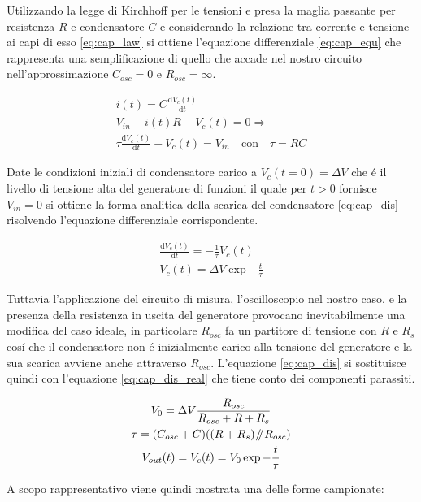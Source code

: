 \documentclass{article}
\newcommand{\de}{\mathrm{d}}
\newcommand{\pars}{\mathbin{\!/\mkern-5mu/\!}}
\begin{document}
Utilizzando la legge di Kirchhoff per le tensioni e presa la maglia passante per resistenza $R$ e condensatore $C$ e considerando la relazione tra corrente e tensione ai capi di esso \ref{eq:cap_law} si ottiene l'equazione differenziale \ref{eq:cap_equ} che rappresenta una semplificazione di quello che accade nel nostro circuito nell'approssimazione $C_{osc}=0$ e $R_{osc} = \infty $.

\begin{gather}
    i(t) = C \frac{\de V_c (t)}{\de t}
    \label{eq:cap_law} \\   
    \nonumber V_{in} - i(t) R - V_c(t) = 0 \Rightarrow \\
    \tau \frac{\de V_c(t)}{\de t} + V_c(t) = V_{in} \quad \textrm{con} \quad \tau = RC
    \label{eq:cap_equ}
\end{gather}

Date le condizioni iniziali di condensatore carico a $V_c(t = 0) = \Delta V$ che \'e il livello di tensione alta del generatore di funzioni il quale per $t > 0$ fornisce $V_{in} = 0$ si ottiene la forma analitica della scarica del condensatore \ref{eq:cap_dis} risolvendo l'equazione differenziale corrispondente.

\begin{gather}
	\nonumber 
	\frac{\de V_c(t)}{\de t} = - \frac{1}{\tau} V_c(t) \\
	V_c(t) = \Delta V \exp{- \frac{t}{\tau}}
	\label{eq:cap_dis}
\end{gather}

Tuttavia l'applicazione del circuito di misura, l'oscilloscopio nel nostro caso, e la presenza della resistenza in uscita del generatore provocano inevitabilmente una modifica del caso ideale, in particolare $R_{osc}$ fa un partitore di tensione con $R$ e $R_{s}$ cos\'i che il condensatore non \'e inizialmente carico alla tensione del generatore e la sua scarica avviene anche attraverso $R_{osc}$.
L'equazione \ref{eq:cap_dis} si sostituisce quindi con l'equazione \ref{eq:cap_dis_real} che tiene conto dei componenti parassiti.

\begin{gather}
	\nonumber 
	V_0 = \Delta V \frac{R_{osc}}{R_{osc} + R + R_{s}} \\ 
	\tau = ( C_{osc} + C ) ( (R + R_s) \pars R_{osc} ) \\
	V_{out}(t) = V_c(t) = V_0 \exp{ -\frac{t}{\tau} }
	\label{eq:cap_dis_real}
\end{gather}

A scopo rappresentativo viene quindi mostrata una delle forme campionate:
\end{document}
